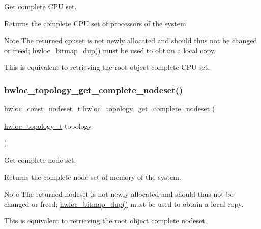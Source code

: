 Get complete C\+PU set. 

\begin{DoxyReturn}{Returns}
the complete C\+PU set of processors of the system.
\end{DoxyReturn}
\begin{DoxyNote}{Note}
The returned cpuset is not newly allocated and should thus not be changed or freed; \hyperlink{a00205_gae679434c1a5f41d3560a8a7e2c1b0dee}{hwloc\+\_\+bitmap\+\_\+dup()} must be used to obtain a local copy.

This is equivalent to retrieving the root object complete C\+P\+U-\/set. 
\end{DoxyNote}
\mbox{\label{a00202_ga773fd98949461ef4c1e3170bb0c0418f}} 
\subsubsection{\texorpdfstring{hwloc\+\_\+topology\+\_\+get\+\_\+complete\+\_\+nodeset()}{hwloc\_topology\_get\_complete\_nodeset()}}
{\footnotesize\ttfamily \hyperlink{a00183_ga2f5276235841ad66a79bedad16a5a10c}{hwloc\+\_\+const\+\_\+nodeset\+\_\+t} hwloc\+\_\+topology\+\_\+get\+\_\+complete\+\_\+nodeset (\begin{DoxyParamCaption}\item[{\hyperlink{a00186_ga9d1e76ee15a7dee158b786c30b6a6e38}{hwloc\+\_\+topology\+\_\+t}}]{topology }\end{DoxyParamCaption})}



Get complete node set. 

\begin{DoxyReturn}{Returns}
the complete node set of memory of the system.
\end{DoxyReturn}
\begin{DoxyNote}{Note}
The returned nodeset is not newly allocated and should thus not be changed or freed; \hyperlink{a00205_gae679434c1a5f41d3560a8a7e2c1b0dee}{hwloc\+\_\+bitmap\+\_\+dup()} must be used to obtain a local copy.

This is equivalent to retrieving the root object complete nodeset. 
\end{DoxyNote}
\mbox{\label{a00202_ga79212faa07b70dd26588941b17d9fa82}} 
